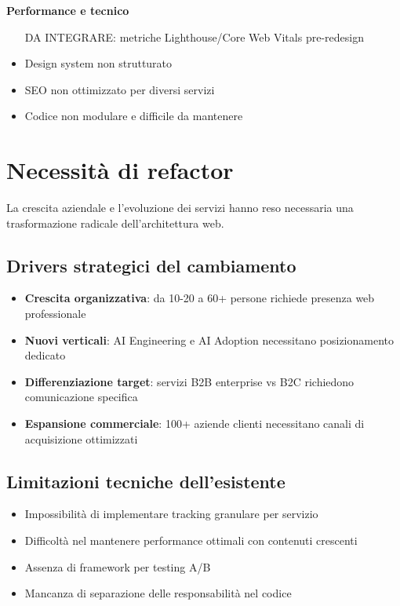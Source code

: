 \textbf{Performance e tecnico}
\begin{itemize}
  \item [DA INTEGRARE: metriche Lighthouse/Core Web Vitals pre-redesign]
  \item Design system non strutturato
  \item SEO non ottimizzato per diversi servizi
  \item Codice non modulare e difficile da mantenere
\end{itemize}

\section{Necessità di refactor}
La crescita aziendale e l'evoluzione dei servizi hanno reso necessaria una trasformazione radicale dell'architettura web.

\subsection{Drivers strategici del cambiamento}
\begin{itemize}
  \item \textbf{Crescita organizzativa}: da 10-20 a 60+ persone richiede presenza web professionale
  \item \textbf{Nuovi verticali}: AI Engineering e AI Adoption necessitano posizionamento dedicato
  \item \textbf{Differenziazione target}: servizi B2B enterprise vs B2C richiedono comunicazione specifica
  \item \textbf{Espansione commerciale}: 100+ aziende clienti necessitano canali di acquisizione ottimizzati
\end{itemize}

\subsection{Limitazioni tecniche dell'esistente}
\begin{itemize}
  \item Impossibilità di implementare tracking granulare per servizio
  \item Difficoltà nel mantenere performance ottimali con contenuti crescenti
  \item Assenza di framework per testing A/B
  \item Mancanza di separazione delle responsabilità nel codice
\end{itemize}

